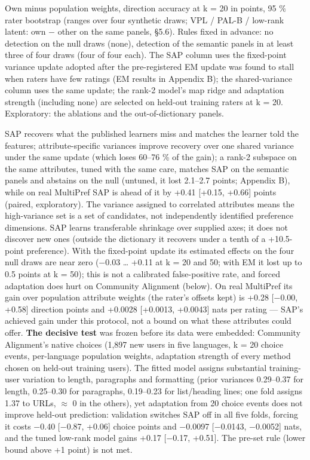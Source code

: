 \documentclass{article}
\begin{document}
Own minus population weights, direction accuracy at k = 20 in points, 95 \% rater bootstrap (ranges over four synthetic draws; VPL / PAL-B / low-rank latent: own $-$ other on the same panels, \S{}5.6). Rules fixed in advance: no detection on the null draws (none), detection of the semantic panels in at least three of four draws (four of four each). The SAP column uses the fixed-point variance update adopted after the pre-registered EM update was found to stall when raters have few ratings (EM results in Appendix B); the shared-variance column uses the same update; the rank-2 model's map ridge and adaptation strength (including none) are selected on held-out training raters at k = 20. Exploratory: the ablations and the out-of-dictionary panels.

SAP recovers what the published learners miss and matches the learner told the features; attribute-specific variances improve recovery over one shared variance under the same update (which loses 60--76 \% of the gain); a rank-2 subspace on the same attributes, tuned with the same care, matches SAP on the semantic panels and abstains on the null (untuned, it lost 2.1--2.7 points; Appendix B), while on real MultiPref SAP is ahead of it by +0.41 {[}+0.15, +0.66{]} points (paired, exploratory). The variance assigned to correlated attributes means the high-variance set is a set of candidates, not independently identified preference dimensions. SAP learns transferable shrinkage over supplied axes; it does not discover new ones (outside the dictionary it recovers under a tenth of a +10.5-point preference). With the fixed-point update its estimated effects on the four null draws are near zero ($-$0.03 \ldots{} +0.11 at k = 20 and 50; with EM it lost up to 0.5 points at k = 50); this is not a calibrated false-positive rate, and forced adaptation does hurt on Community Alignment (below). On real MultiPref its gain over population attribute weights (the rater's offsets kept) is +0.28 {[}$-$0.00, +0.58{]} direction points and +0.0028 {[}+0.0013, +0.0043{]} nats per rating --- SAP's achieved gain under this protocol, not a bound on what these attributes could offer. \textbf{The decisive test} was frozen before its data were embedded: Community Alignment's native choices (1,897 new users in five languages, k = 20 choice events, per-language population weights, adaptation strength of every method chosen on held-out training users). The fitted model assigns substantial training-user variation to length, paragraphs and formatting (prior variances 0.29--0.37 for length, 0.25--0.30 for paragraphs, 0.19--0.23 for list/heading lines; one fold assigns 1.37 to URLs, $\approx$ 0 in the others), yet adaptation from 20 choice events does not improve held-out prediction: validation switches SAP off in all five folds, forcing it costs $-$0.40 {[}$-$0.87, +0.06{]} choice points and $-$0.0097 {[}$-$0.0143, $-$0.0052{]} nats, and the tuned low-rank model gains +0.17 {[}$-$0.17, +0.51{]}. The pre-set rule (lower bound above +1 point) is not met.
\end{document}

